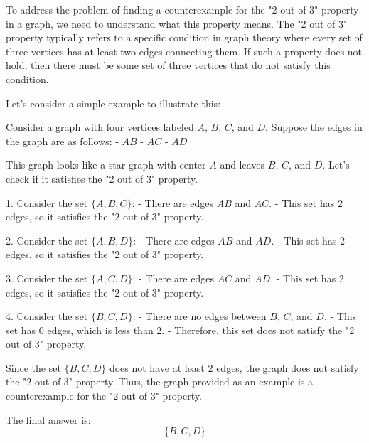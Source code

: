 To address the problem of finding a counterexample for the "2 out of 3" property in a graph, we need to understand what this property means. The "2 out of 3" property typically refers to a specific condition in graph theory where every set of three vertices has at least two edges connecting them. If such a property does not hold, then there must be some set of three vertices that do not satisfy this condition.

Let's consider a simple example to illustrate this:

Consider a graph with four vertices labeled \(A\), \(B\), \(C\), and \(D\). Suppose the edges in the graph are as follows:
- \(AB\)
- \(AC\)
- \(AD\)

This graph looks like a star graph with center \(A\) and leaves \(B\), \(C\), and \(D\). Let's check if it satisfies the "2 out of 3" property.

1. Consider the set \(\{A, B, C\}\):
   - There are edges \(AB\) and \(AC\).
   - This set has 2 edges, so it satisfies the "2 out of 3" property.

2. Consider the set \(\{A, B, D\}\):
   - There are edges \(AB\) and \(AD\).
   - This set has 2 edges, so it satisfies the "2 out of 3" property.

3. Consider the set \(\{A, C, D\}\):
   - There are edges \(AC\) and \(AD\).
   - This set has 2 edges, so it satisfies the "2 out of 3" property.

4. Consider the set \(\{B, C, D\}\):
   - There are no edges between \(B\), \(C\), and \(D\).
   - This set has 0 edges, which is less than 2.
   - Therefore, this set does not satisfy the "2 out of 3" property.

Since the set \(\{B, C, D\}\) does not have at least 2 edges, the graph does not satisfy the "2 out of 3" property. Thus, the graph provided as an example is a counterexample for the "2 out of 3" property.

The final answer is:
\[
\boxed{\{B, C, D\}}
\]